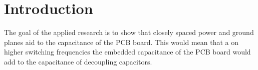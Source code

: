 \section{Introduction}\label{sec: Introduction}
The goal of the applied research is to show that closely spaced power and ground planes aid to the capacitance of the PCB board. This would mean that a on higher switching frequencies the embedded capacitance of the PCB board would add to the capacitance of decoupling capacitors.
